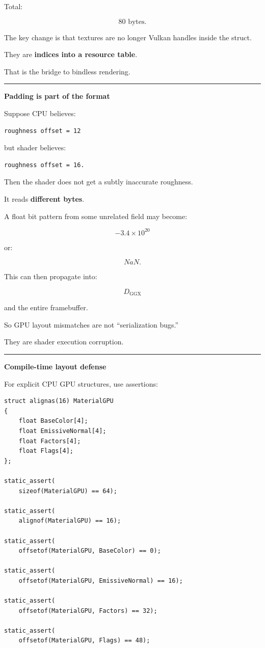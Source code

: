 Total:

\[
80\text{ bytes}.
\]

The key change is that textures are no longer Vulkan handles inside the struct.

They are \textbf{indices into a resource table}.

That is the bridge to bindless rendering.

\begin{center}\rule{0.5\linewidth}{0.5pt}\end{center}

\textbf{Padding is part of the format}

Suppose CPU believes:

\begin{verbatim}
roughness offset = 12
\end{verbatim}

but shader believes:

\begin{verbatim}
roughness offset = 16.
\end{verbatim}

Then the shader does not get a subtly inaccurate roughness.

It reads \textbf{different bytes}.

A float bit pattern from some unrelated field may become:

\[
-3.4\times10^{20}
\]

or:

\[
NaN.
\]

This can then propagate into:

\[
D_{\text{GGX}}
\]

and the entire framebuffer.

So GPU layout mismatches are not ``serialization bugs.''

They are shader execution corruption.

\begin{center}\rule{0.5\linewidth}{0.5pt}\end{center}

\textbf{Compile-time layout defense}

For explicit CPU GPU structures, use assertions:

\begin{verbatim}
struct alignas(16) MaterialGPU
{
    float BaseColor[4];
    float EmissiveNormal[4];
    float Factors[4];
    float Flags[4];
};

static_assert(
    sizeof(MaterialGPU) == 64);

static_assert(
    alignof(MaterialGPU) == 16);

static_assert(
    offsetof(MaterialGPU, BaseColor) == 0);

static_assert(
    offsetof(MaterialGPU, EmissiveNormal) == 16);

static_assert(
    offsetof(MaterialGPU, Factors) == 32);

static_assert(
    offsetof(MaterialGPU, Flags) == 48);
\end{verbatim}

